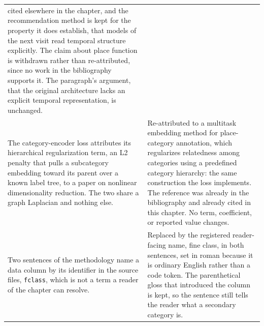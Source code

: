 \begin{table}[htb]
\begin{tabular}{@{}p{}p{}@{}}
cited elsewhere in the chapter, and the recommendation method is kept for the property it does
establish, that models of the next visit read temporal structure explicitly. The claim about
place function is withdrawn rather than re-attributed, since no work in the bibliography
supports it. The paragraph's argument, that the original architecture lacks an explicit
temporal representation, is unchanged. \\
\addlinespace
The category-encoder loss attributes its hierarchical regularization term, an L2 penalty that
pulls a subcategory embedding toward its parent over a known label tree, to a paper on
nonlinear dimensionality reduction. The two share a graph Laplacian and nothing else. &
Re-attributed to a multitask embedding method for place-category annotation, which
regularizes relatedness among categories using a predefined category hierarchy: the same
construction the loss implements. The reference was already in the bibliography and already
cited in this chapter. No term, coefficient, or reported value changes. \\
\addlinespace
Two sentences of the methodology name a data column by its identifier in the source files,
\texttt{fclass}, which is not a term a reader of the chapter can resolve. &
Replaced by the registered reader-facing name, fine class, in both sentences, set in roman
because it is ordinary English rather than a code token. The parenthetical gloss that
introduced the column is kept, so the sentence still tells the reader what a secondary
category is. \\
\bottomrule
\end{tabular}
\end{table}
